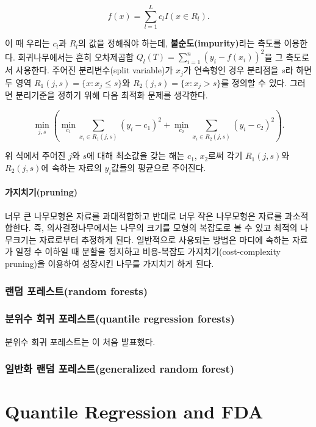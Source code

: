 \documentclass[b5paper,]{scrbook}
\theoremstyle{plain}
\theoremstyle{definition}
\numberwithin{equation}{section}
\begin{document}
\[f(x)=\sum_{l=1}^{L}c_{l}I(x\in R_{l}).\]

이 때 우리는 \(c_{l}\)과 \(R_{l}\)의 값을 정해줘야 하는데,
\textbf{불순도(impurity)}라는 측도를 이용한다. 회귀나무에서는 흔히
오차제곱합 \(Q_{l}(T)=\sum_{i=1}^{n}(y_{i}-f(x_{i}))^{2}\)을 그 측도로서
사용한다. 주어진 분리변수(split variable)가 \(x_{j}\)가 연속형인 경우
분리점을 \(s\)라 하면 두 영역 \(R_{1}(j,s)=\{ x: x_{j} \leq s\}\)와
\(R_{2}(j,s)=\{ x: x_{j} > s\}\)를 정의할 수 있다. 그러면 분리기준을
정하기 위해 다음 최적화 문제를 생각한다.

\[\min_{j,s}(\min_{c_{1}}\sum_{x_{i}\in R_{1}(j,s)}(y_{i}-c_{1})^{2} + \min_{c_{2}}\sum_{x_{i}\in R_{2}(j,s)}(y_{i}-c_{2})^{2}).\]

위 식에서 주어진 \(j\)와 \(s\)에 대해 최소값을 갖는 해는 \(c_{1}\),
\(x_{2}\)로써 각기 \(R_{1}(j,s)\)와 \(R_{2}(j,s)\)에 속하는 자료의
\(y_{i}\)값들의 평균으로 주어진다.

\subsection{가지치기(pruning)}\label{pruning}

너무 큰 나무모형은 자료를 과대적합하고 반대로 너무 작은 나무모형은
자료를 과소적합한다. 즉, 의사결정나무에서는 나무의 크기를 모형의
복잡도로 볼 수 있고 최적의 나무크기는 자료로부터 추정하게 된다.
일반적으로 사용되는 방법은 마디에 속하는 자료가 일정 수 이하일 때 분할을
정지하고 비용-복잡도 가지치기(cost-complexity pruning)을 이용하여
성장시킨 나무를 가지치기 하게 된다.

\section{랜덤 포레스트(random forests)}\label{-random-forests}

\section{분위수 회귀 포레스트(quantile regression
forests)}\label{--quantile-regression-forests}

분위수 회귀 포레스트는 \citep{Meinshausen2006}이 처음 발표했다.

\section{일반화 랜덤 포레스트(generalized random
forest)}\label{--generalized-random-forest}

\part{Quantile Regression and
FDA}\label{part-quantile-regression-and-fda}
\end{document}
